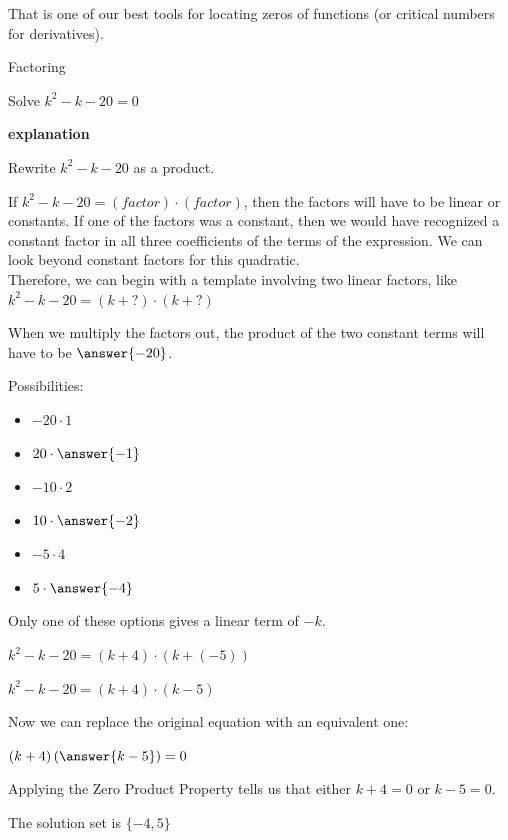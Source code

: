 \documentclass{ximera}
\begin{document}
That is one of our best tools for locating zeros of functions (or critical numbers for derivatives). 



\begin{example} Factoring

Solve $k^2 - k - 20 = 0$ 

\textbf{\textcolor{red!75!green}{explanation}} 



Rewrite $k^2 - k - 20$ as a product.

If $k^2 - k - 20 = (factor) \cdot (factor)$, then the factors will have to be linear or constants.  If one of the factors was a constant, then we would have recognized a constant factor in all three coefficients of the terms of the expression.  We can look beyond constant factors for this quadratic. \\

Therefore, we can begin with a template involving two linear factors, like $k^2 - k - 20 = (k + ?) \cdot (k + ?)$

When we multiply the factors out, the product of the two constant terms will have to be $\answer{-20}$.

Possibilities:
\begin{itemize}
\item $-20 \cdot 1$
\item $20 \cdot \answer{-1}$
\item $-10 \cdot 2$
\item $10 \cdot \answer{-2}$
\item $-5 \cdot 4$
\item $5 \cdot \answer{-4}$
\end{itemize}



Only one of these options gives a linear term of $-k$.


$k^2 - k - 20 = (k + 4) \cdot (k + (-5))$

$k^2 - k - 20 = (k + 4) \cdot (k - 5)$



Now we can replace the original equation with an equivalent one:


$(k + 4) \left( \answer{k - 5} \right) = 0$



Applying the Zero Product Property tells us that either $k + 4 = 0$ or $k - 5 = 0$.  

The solution set is $\{ -4, 5 \}$




\end{example}
\end{document}

